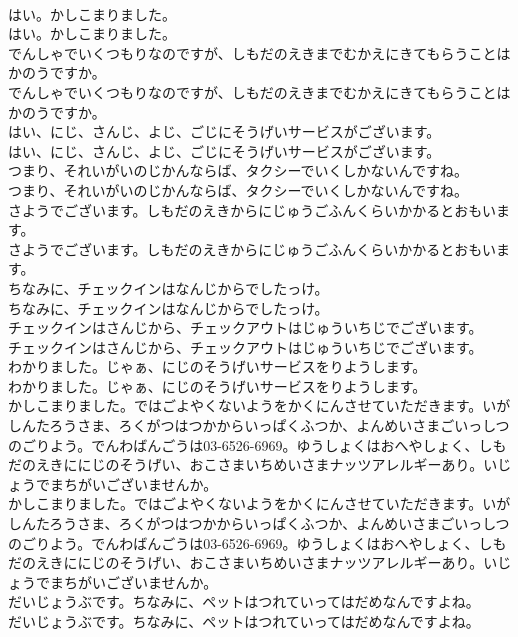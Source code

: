 \documentclass[8pt]{extreport}
\begin{document}
\begin{CJK}{UTF8}{min}
\\	はい。かしこまりました。	
\\	はい。かしこまりました。 
\\	でんしゃでいくつもりなのですが、しもだのえきまでむかえにきてもらうことはかのうですか。	
\\	でんしゃでいくつもりなのですが、しもだのえきまでむかえにきてもらうことはかのうですか。 
\\	はい、にじ、さんじ、よじ、ごじにそうげいサービスがございます。	
\\	はい、にじ、さんじ、よじ、ごじにそうげいサービスがございます。 
\\	つまり、それいがいのじかんならば、タクシーでいくしかないんですね。	
\\	つまり、それいがいのじかんならば、タクシーでいくしかないんですね。 
\\	さようでございます。しもだのえきからにじゅうごふんくらいかかるとおもいます。	
\\	さようでございます。しもだのえきからにじゅうごふんくらいかかるとおもいます。 
\\	ちなみに、チェックインはなんじからでしたっけ。	
\\	ちなみに、チェックインはなんじからでしたっけ。 
\\	チェックインはさんじから、チェックアウトはじゅういちじでございます。	
\\	チェックインはさんじから、チェックアウトはじゅういちじでございます。 
\\	わかりました。じゃぁ、にじのそうげいサービスをりようします。	
\\	わかりました。じゃぁ、にじのそうげいサービスをりようします。 
\\	かしこまりました。ではごよやくないようをかくにんさせていただきます。いが　しんたろうさま、ろくがつはつかからいっぱくふつか、よんめいさまごいっしつのごりよう。でんわばんごうは03-6526-6969。ゆうしょくはおへやしょく、しもだのえきににじのそうげい、おこさまいちめいさまナッツアレルギーあり。いじょうでまちがいございませんか。	
\\	かしこまりました。ではごよやくないようをかくにんさせていただきます。いが　しんたろうさま、ろくがつはつかからいっぱくふつか、よんめいさまごいっしつのごりよう。でんわばんごうは03-6526-6969。ゆうしょくはおへやしょく、しもだのえきににじのそうげい、おこさまいちめいさまナッツアレルギーあり。いじょうでまちがいございませんか。 
\\	だいじょうぶです。ちなみに、ペットはつれていってはだめなんですよね。	
\\	だいじょうぶです。ちなみに、ペットはつれていってはだめなんですよね。 

\end{CJK}
\end{document}
